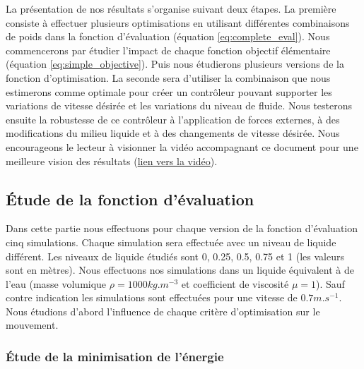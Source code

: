 \documentclass[runningheads,a4paper]{llncs}
\begin{document}
La présentation de nos résultats s'organise suivant deux étapes. La première consiste à effectuer plusieurs optimisations en utilisant différentes combinaisons de poids dans la fonction d'évaluation (équation \ref{eq:complete_eval}). Nous commencerons par étudier l'impact de chaque fonction objectif élémentaire (équation \ref{eq:simple_objective}). Puis nous étudierons plusieurs versions de la fonction d'optimisation. La seconde sera d'utiliser la combinaison que nous estimerons comme optimale pour créer un contrôleur pouvant supporter les variations de vitesse désirée et les variations du niveau de fluide. Nous testerons ensuite la robustesse de ce contrôleur à l'application de forces externes, à des modifications du milieu liquide et à des changements de vitesse désirée. Nous encourageons le lecteur à visionner la vidéo accompagnant ce document pour une meilleure vision des résultats (\href{https://drive.google.com/folderview?id=0B6n5UVMEGbGHfjM5a1phUHZGaUtLNVRNanFDT2xRd19zN0x1UmNabjlCVGN6c1ZFdWRLczA&usp=sharing}{lien vers la vidéo}).

\subsection{Étude de la fonction d'évaluation}

Dans cette partie nous effectuons pour chaque version de la fonction d'évaluation cinq simulations. Chaque simulation sera effectuée avec un niveau de liquide différent. Les niveaux de liquide étudiés sont 0, 0.25, 0.5, 0.75 et 1 (les valeurs sont en mètres). Nous effectuons nos simulations dans un liquide équivalent à de l'eau (masse volumique $\rho =1000kg.m^{-3}$ et coefficient de viscosité  $\mu =1$). Sauf contre indication les simulations sont effectuées pour une vitesse de $0.7m.s^{-1}$. Nous étudions d'abord l'influence de chaque critère d'optimisation sur le mouvement.

\subsubsection{Étude de la minimisation de l'énergie}
\end{document}
